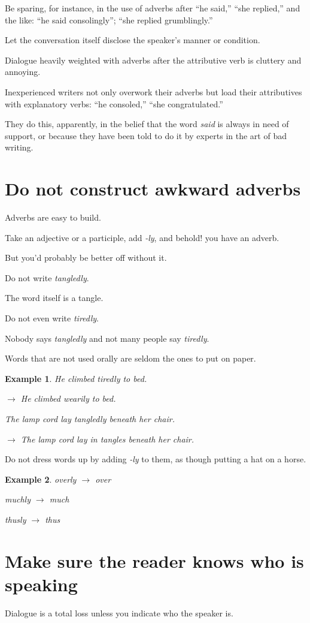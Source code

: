 \documentclass{book}
\numberwithin{equation}{section}
\newtheorem{example}{Example}[chapter]
\begin{document}
Be sparing, for instance, in the use of adverbs after ``he said,'' ``she replied,'' and the like: ``he said consolingly''; ``she replied grumblingly.''

Let the conversation itself disclose the speaker's manner or condition.

Dialogue heavily weighted with adverbs after the attributive verb is cluttery and annoying.

Inexperienced writers not only overwork their adverbs but load their attributives with explanatory verbs: ``he consoled,'' ``she congratulated.''

They do this, apparently, in the belief that the word \textit{said} is always in need of support, or because they have been told to do it by experts in the art of bad writing.

\section{Do not construct awkward adverbs}
Adverbs are easy to build.

Take an adjective or a participle, add \textit{-ly}, and behold! you have an adverb.

But you'd probably be better off without it.

Do not write \textit{tangledly}.

The word itself is a tangle.

Do not even write \textit{tiredly}.

Nobody says \textit{tangledly} and not many people say \textit{tiredly}.

Words that are not used orally are seldom the ones to put on paper.
\begin{example}
    He climbed tiredly to bed.
    
    $\to$ He climbed wearily to bed.
    
    The lamp cord lay tangledly beneath her chair.
    
    $\to$ The lamp cord lay in tangles beneath her chair.
\end{example}
Do not dress words up by adding \textit{-ly} to them, as though putting a hat on a horse.
\begin{example}
    overly $\to$ over
    
    muchly $\to$ much
    
    thusly $\to$ thus
\end{example}

\section{Make sure the reader knows who is speaking}
Dialogue is a total loss unless you indicate who the speaker is.
\end{document}

